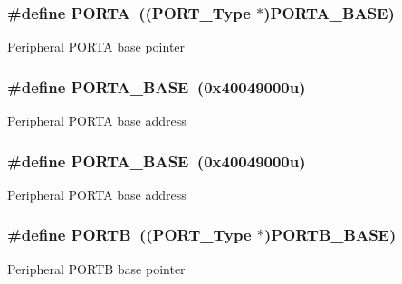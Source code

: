 \subsubsection[{\texorpdfstring{P\+O\+R\+TA}{PORTA}}]{\setlength{\rightskip}{0pt plus 5cm}\#define P\+O\+R\+TA~(({\bf P\+O\+R\+T\+\_\+\+Type} $\ast$){\bf P\+O\+R\+T\+A\+\_\+\+B\+A\+SE})}\hypertarget{group__PORT__Peripheral__Access__Layer_ga7c8a7f98a98d8cb125dd57a66720ab30}{}\label{group__PORT__Peripheral__Access__Layer_ga7c8a7f98a98d8cb125dd57a66720ab30}
Peripheral P\+O\+R\+TA base pointer 
\subsubsection[{\texorpdfstring{P\+O\+R\+T\+A\+\_\+\+B\+A\+SE}{PORTA_BASE}}]{\setlength{\rightskip}{0pt plus 5cm}\#define P\+O\+R\+T\+A\+\_\+\+B\+A\+SE~(0x40049000u)}\hypertarget{group__PORT__Peripheral__Access__Layer_gae3d20f730f9619aabbf94e2efd1de34c}{}\label{group__PORT__Peripheral__Access__Layer_gae3d20f730f9619aabbf94e2efd1de34c}
Peripheral P\+O\+R\+TA base address 
\subsubsection[{\texorpdfstring{P\+O\+R\+T\+A\+\_\+\+B\+A\+SE}{PORTA_BASE}}]{\setlength{\rightskip}{0pt plus 5cm}\#define P\+O\+R\+T\+A\+\_\+\+B\+A\+SE~(0x40049000u)}\hypertarget{group__PORT__Peripheral__Access__Layer_gae3d20f730f9619aabbf94e2efd1de34c}{}\label{group__PORT__Peripheral__Access__Layer_gae3d20f730f9619aabbf94e2efd1de34c}
Peripheral P\+O\+R\+TA base address 
\subsubsection[{\texorpdfstring{P\+O\+R\+TB}{PORTB}}]{\setlength{\rightskip}{0pt plus 5cm}\#define P\+O\+R\+TB~(({\bf P\+O\+R\+T\+\_\+\+Type} $\ast$){\bf P\+O\+R\+T\+B\+\_\+\+B\+A\+SE})}\hypertarget{group__PORT__Peripheral__Access__Layer_ga09a0c85cd3da09d9cdf63a5ac4c39f77}{}\label{group__PORT__Peripheral__Access__Layer_ga09a0c85cd3da09d9cdf63a5ac4c39f77}
Peripheral P\+O\+R\+TB base pointer 
